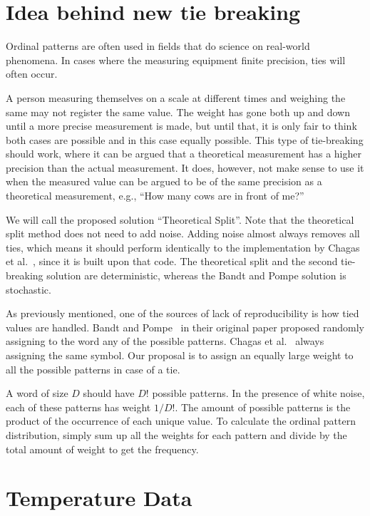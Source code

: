 \FloatBarrier

\section{Idea behind new tie breaking}

Ordinal patterns are often used in fields that do science on real-world phenomena. In cases where the measuring equipment finite precision, ties will often occur. 

A person measuring themselves on a scale at different times and weighing the same may not register the same value.
The weight has gone both up and down until a more precise measurement is made, but until that, it is only fair to think both cases are possible and in this case equally possible. 
This type of tie-breaking should work, where it can be argued that a theoretical measurement has a higher precision than the actual measurement. 
It does, however, not make sense to use it when the measured value can be argued to be of the same precision as a theoretical measurement, e.g., “How many cows are in front of me?” 

We will call the proposed solution “Theoretical Split”. 
Note that the theoretical split method does not need to add noise. 
Adding noise almost always removes all ties, which means it should perform identically to the implementation by Chagas et al.~\cite{Chagas2022}, since it is built upon that code. 
The theoretical split and the second tie-breaking solution are deterministic, whereas the Bandt and Pompe solution is stochastic.

As previously mentioned, one of the sources of lack of reproducibility is how tied values are handled.
Bandt and Pompe~\cite{Bandt2002}  in their original paper proposed randomly assigning to the word any of the possible patterns.
Chagas et al.~\cite{Chagas2022} always assigning the same symbol.
Our proposal is to assign an equally large weight to all the possible patterns in case of a tie.

A word of size $D$ should have $D!$ possible patterns.
In the presence of white noise, each of these patterns has weight ${1}/{D!}$. 
The amount of possible patterns is the product of the occurrence of each unique value. 
To calculate the ordinal pattern distribution, simply sum up all the weights for each pattern and divide by the total amount of weight to get the frequency. 


\section{Temperature Data}

